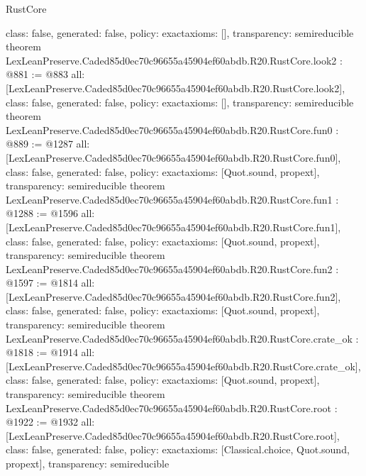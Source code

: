 \begin{lexlean}{RustCore}
\begin{coremodule}
{  class: false,
  generated: false,
  policy: exact{axioms: []},
  transparency: semireducible
}
theorem LexLeanPreserve.Caded85d0ec70c96655a45904ef60abdb.R20.RustCore.look2 : @881 := @883 {
  all: [LexLeanPreserve.Caded85d0ec70c96655a45904ef60abdb.R20.RustCore.look2],
  class: false,
  generated: false,
  policy: exact{axioms: []},
  transparency: semireducible
}
theorem LexLeanPreserve.Caded85d0ec70c96655a45904ef60abdb.R20.RustCore.fun0 : @889 := @1287 {
  all: [LexLeanPreserve.Caded85d0ec70c96655a45904ef60abdb.R20.RustCore.fun0],
  class: false,
  generated: false,
  policy: exact{axioms: [Quot.sound, propext]},
  transparency: semireducible
}
theorem LexLeanPreserve.Caded85d0ec70c96655a45904ef60abdb.R20.RustCore.fun1 : @1288 := @1596 {
  all: [LexLeanPreserve.Caded85d0ec70c96655a45904ef60abdb.R20.RustCore.fun1],
  class: false,
  generated: false,
  policy: exact{axioms: [Quot.sound, propext]},
  transparency: semireducible
}
theorem LexLeanPreserve.Caded85d0ec70c96655a45904ef60abdb.R20.RustCore.fun2 : @1597 := @1814 {
  all: [LexLeanPreserve.Caded85d0ec70c96655a45904ef60abdb.R20.RustCore.fun2],
  class: false,
  generated: false,
  policy: exact{axioms: [Quot.sound, propext]},
  transparency: semireducible
}
theorem LexLeanPreserve.Caded85d0ec70c96655a45904ef60abdb.R20.RustCore.crate_ok : @1818 := @1914 {
  all: [LexLeanPreserve.Caded85d0ec70c96655a45904ef60abdb.R20.RustCore.crate_ok],
  class: false,
  generated: false,
  policy: exact{axioms: [Quot.sound, propext]},
  transparency: semireducible
}
theorem LexLeanPreserve.Caded85d0ec70c96655a45904ef60abdb.R20.RustCore.root : @1922 := @1932 {
  all: [LexLeanPreserve.Caded85d0ec70c96655a45904ef60abdb.R20.RustCore.root],
  class: false,
  generated: false,
  policy: exact{axioms: [Classical.choice, Quot.sound, propext]},
  transparency: semireducible
}


\end{coremodule}
\end{lexlean}
